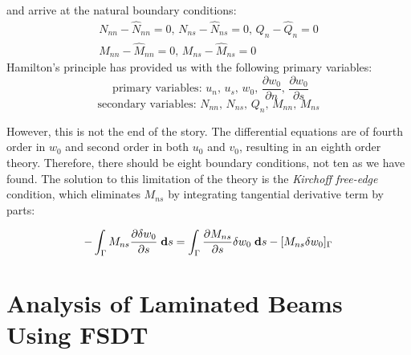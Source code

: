 \documentclass[11pt,letterpaper,titlepage,draft]{article}
\newcommand{\diff}{\textbf d}
\newcommand{\PDer}[2]{\frac{\partial #1}{\partial #2}}
\newcommand{\Vartn}[1]{\delta #1}
\numberwithin{equation}{subsection}
\begin{document}

and arrive at the natural boundary conditions:
\begin{multline}\label{E:S1001:SS102:26}
N_{nn} - \hat{N}_{nn} = 0\text{, }N_{ns} - \hat{N}_{ns} = 0\text{, }Q_n - \hat{Q}_n = 0
\\
M_{nn} - \hat{M}_{nn} = 0\text{, }M_{ns} - \hat{M}_{ns} = 0
\end{multline}
Hamilton's principle has provided us with the following primary variables:
$$\text{  primary variables:  }u_n\text{, }u_s\text{, }w_0\text{, }\PDer{w_0}{n}\text{, }\PDer{w_0}{s}$$
$$\text{secondary variables:  }N_{nn}\text{, }N_{ns}\text{, }Q_n\text{, }M_{nn}\text{, }M_{ns}$$

However, this is not the end of the story.  The differential equations are of fourth order in $w_0$ 
and second order in both $u_0$ and $v_0$, resulting in an eighth order theory.
Therefore, there should be eight boundary conditions, not ten as we have found.
The solution to this limitation of the theory is the \emph{Kirchoff free-edge} condition, which 
eliminates $M_{ns}$ by integrating tangential derivative term by parts:

\begin{equation}\label{E:S1001:SS102:27}
-\int_{\Gamma} M_{ns} \PDer{\Vartn{w_0}}{s}\; \diff{s} = \int_{\Gamma} \PDer{M_{ns}}{s}\Vartn{w_0}\; \diff{s} - [M_{ns}\Vartn{w_0}]_{\Gamma}
\end{equation}

\newpage
\section{Analysis of Laminated Beams Using FSDT}
\end{document}
